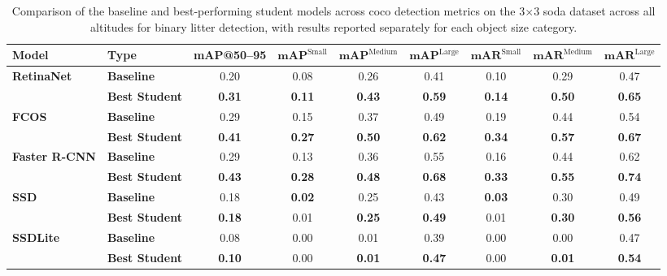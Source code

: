 \begin{table*}[htbp]
\centering
\renewcommand{\arraystretch}{1.35} %
\begin{adjustbox}{width=\textwidth}
\begin{tabular}{llccccccc}
\hline
\textbf{Model} & \textbf{Type} & \textbf{mAP@50--95} & \(\mathbf{mAP}^{\text{Small}}\) & \(\mathbf{mAP}^{\text{Medium}}\) & \(\mathbf{mAP}^{\text{Large}}\) & \(\mathbf{mAR}^{\text{Small}}\) & \(\mathbf{mAR}^{\text{Medium}}\) & \(\mathbf{mAR}^{\text{Large}}\) \\ \hline
\multirow{2}{*}{\textbf{RetinaNet}} 
 & \textbf{Baseline}      & 0.20 & 0.08 & 0.26 & 0.41 & 0.10 & 0.29 & 0.47 \\
 & \textbf{Best Student}  & \textbf{0.31} & \textbf{0.11} & \textbf{0.43} & \textbf{0.59} & \textbf{0.14} & \textbf{0.50} & \textbf{0.65} \\ \hline
\multirow{2}{*}{\textbf{FCOS}} 
 & \textbf{Baseline}      & 0.29 & 0.15 & 0.37 & 0.49 & 0.19 & 0.44 & 0.54 \\
 & \textbf{Best Student}  & \textbf{0.41} & \textbf{0.27} & \textbf{0.50} & \textbf{0.62} & \textbf{0.34} & \textbf{0.57} & \textbf{0.67} \\ \hline
\multirow{2}{*}{\textbf{Faster R-CNN}} 
 & \textbf{Baseline}      & 0.29 & 0.13 & 0.36 & 0.55 & 0.16 & 0.44 & 0.62 \\
 & \textbf{Best Student}  & \textbf{0.43} & \textbf{0.28} & \textbf{0.48} & \textbf{0.68} & \textbf{0.33} & \textbf{0.55} & \textbf{0.74} \\ \hline
\multirow{2}{*}{\textbf{SSD}} 
 & \textbf{Baseline}      & 0.18 & \textbf{0.02} & 0.25 & 0.43 & \textbf{0.03} & 0.30 & 0.49 \\
 & \textbf{Best Student}  & \textbf{0.18} & 0.01 & \textbf{0.25} & \textbf{0.49} & 0.01 & \textbf{0.30} & \textbf{0.56} \\ \hline
\multirow{2}{*}{\textbf{SSDLite}} 
 & \textbf{Baseline}      & 0.08 & 0.00 & 0.01 & 0.39 & 0.00 & 0.00 & 0.47 \\
 & \textbf{Best Student}  & \textbf{0.10} & 0.00 & \textbf{0.01} & \textbf{0.47} & 0.00 & \textbf{0.01} & \textbf{0.54} \\ \hline
\end{tabular}
\end{adjustbox}
\caption{Comparison of the baseline and best‐performing student models across \gls{coco} detection metrics on the 3$\times$3 \gls{soda} dataset across all altitudes for binary litter detection, with results reported separately for each object size category.}
\label{tab:soda_tiled_binary_object_sizes_split}
\end{table*}

